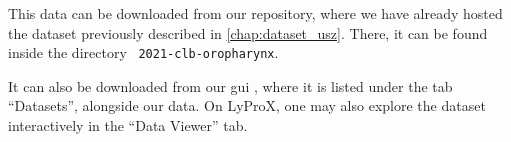 \begin{tcolorbox}[
    title=\faIcon{database} Data,
    parbox=false,
    float
]
    This data can be downloaded from our  repository, where we have already hosted the dataset previously described in \cref{chap:dataset_usz}. There, it can be found inside the directory ~\texttt{2021-clb-oropharynx}.

    It can also be downloaded from our \gls{gui} , where it is listed under the tab ``Datasets'', alongside our data. On LyProX, one may also explore the dataset interactively in the ``Data Viewer'' tab.
\end{tcolorbox}
